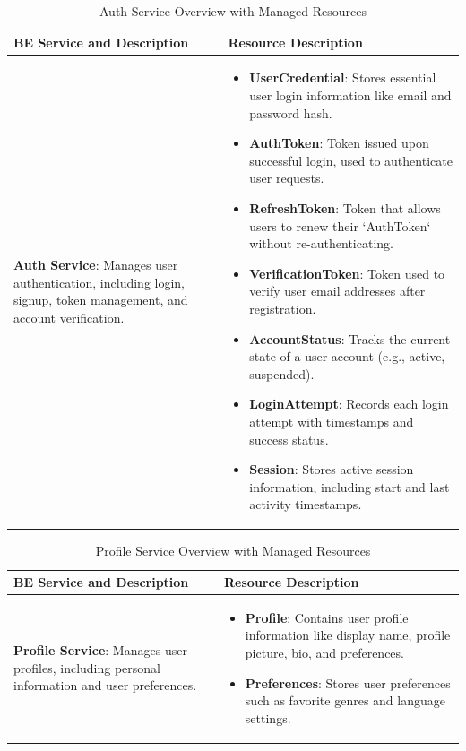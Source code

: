 \documentclass[a4paper,12pt]{article}
\begin{document}
\begin{table}[H]
    \centering
    \renewcommand\arraystretch{1.5}
    \setlength{\tabcolsep}{5pt}
    \begin{tabular}{|>{\centering\arraybackslash}m{4cm}|m{10cm}|}
    \hline
    \textbf{BE Service and Description} & \textbf{Resource Description} \\
    \hline
    \textbf{Auth Service}: Manages user authentication, including login, signup, token management, and account verification. &
    \begin{itemize}[left=0pt]
        \item \textbf{UserCredential}: Stores essential user login information like email and password hash.  
        \item \textbf{AuthToken}: Token issued upon successful login, used to authenticate user requests.  
        \item \textbf{RefreshToken}: Token that allows users to renew their `AuthToken` without re-authenticating.  
        \item \textbf{VerificationToken}: Token used to verify user email addresses after registration.  
        \item \textbf{AccountStatus}: Tracks the current state of a user account (e.g., active, suspended).  
        \item \textbf{LoginAttempt}: Records each login attempt with timestamps and success status.  
        \item \textbf{Session}: Stores active session information, including start and last activity timestamps.
    \end{itemize} \\
    \hline
    \end{tabular}
    \caption{Auth Service Overview with Managed Resources}
    \label{tab:auth-service}
\end{table}

\begin{table}[H]
    \centering
    \renewcommand{\arraystretch}{1.5}
    \begin{tabular}{|>{\centering\arraybackslash}m{4cm}|m{10cm}|}
    \hline
    \textbf{BE Service and Description} & \textbf{Resource Description} \\
    \hline
    \textbf{Profile Service}: Manages user profiles, including personal information and user preferences. & 
    \begin{itemize}[left=0pt]
        \item \textbf{Profile}: Contains user profile information like display name, profile picture, bio, and preferences.
        \item \textbf{Preferences}: Stores user preferences such as favorite genres and language settings.
    \end{itemize} \\
    \hline
    \end{tabular}
    \caption{Profile Service Overview with Managed Resources}
\end{table}
\end{document}
